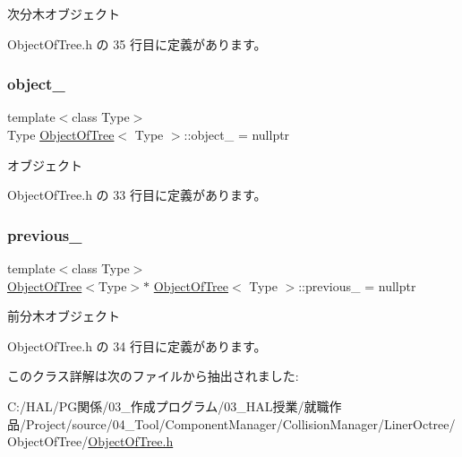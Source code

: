 次分木オブジェクト 



 Object\+Of\+Tree.\+h の 35 行目に定義があります。

\mbox{\label{class_object_of_tree_ad3ce36879f78ba2c2171385a8428c7ba}} 
\subsubsection{\texorpdfstring{object\+\_\+}{object\_}}
{\footnotesize\ttfamily template$<$class Type$>$ \\
Type \mbox{\hyperlink{class_object_of_tree}{Object\+Of\+Tree}}$<$ Type $>$\+::object\+\_\+ = nullptr\hspace{0.3cm}{\ttfamily [private]}}



オブジェクト 



 Object\+Of\+Tree.\+h の 33 行目に定義があります。

\mbox{\label{class_object_of_tree_ac219b6d840381214e54bb248ac1c2693}} 
\subsubsection{\texorpdfstring{previous\+\_\+}{previous\_}}
{\footnotesize\ttfamily template$<$class Type$>$ \\
\mbox{\hyperlink{class_object_of_tree}{Object\+Of\+Tree}}$<$Type$>$$\ast$ \mbox{\hyperlink{class_object_of_tree}{Object\+Of\+Tree}}$<$ Type $>$\+::previous\+\_\+ = nullptr\hspace{0.3cm}{\ttfamily [private]}}



前分木オブジェクト 



 Object\+Of\+Tree.\+h の 34 行目に定義があります。



このクラス詳解は次のファイルから抽出されました\+:\begin{DoxyCompactItemize}
\item 
C\+:/\+H\+A\+L/\+P\+G関係/03\+\_\+作成プログラム/03\+\_\+\+H\+A\+L授業/就職作品/\+Project/source/04\+\_\+\+Tool/\+Component\+Manager/\+Collision\+Manager/\+Liner\+Octree/\+Object\+Of\+Tree/\mbox{\hyperlink{_object_of_tree_8h}{Object\+Of\+Tree.\+h}}\end{DoxyCompactItemize}

